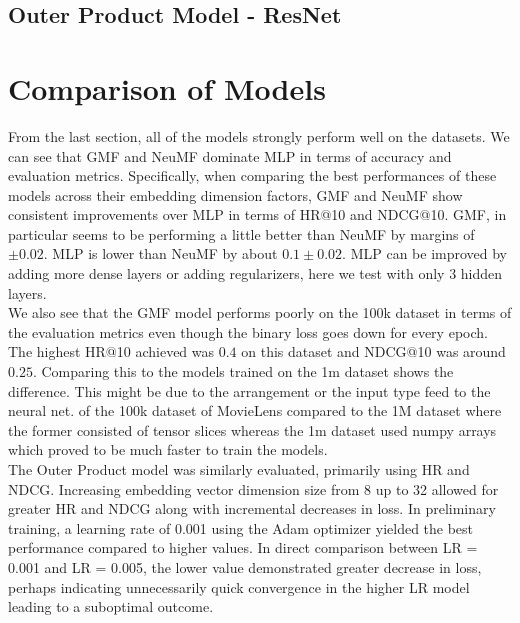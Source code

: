 \documentclass{article}
\begin{document}
\subsection{Outer Product Model - ResNet}


\section{Comparison of Models}
From the last section, all of the models strongly perform well on the datasets. We can see that GMF and NeuMF dominate MLP in terms of accuracy and evaluation metrics. Specifically, when comparing the best performances of these models across their embedding dimension factors, GMF and NeuMF show consistent improvements over MLP in terms of HR@10 and NDCG@10. GMF, in particular seems to be performing a little better than NeuMF by margins of $\pm 0.02$. MLP is lower than NeuMF by about $0.1 \pm 0.02$. MLP can be improved by adding more dense layers or adding regularizers, here we test with only 3 hidden layers.\\

We also see that the GMF model performs poorly on the 100k dataset in terms of the evaluation metrics even though the binary loss goes down for every epoch. The highest HR@10 achieved was $0.4$ on this dataset and NDCG@10 was around $0.25$. Comparing this to the models trained on the 1m dataset shows the difference. This might be due to the arrangement or the input type feed to the neural net. of the 100k dataset of MovieLens compared to the 1M dataset where the former consisted of tensor slices whereas the 1m dataset used numpy arrays which proved to be much faster to train the models.\\

The Outer Product model was similarly evaluated, primarily using HR and NDCG. Increasing embedding vector dimension size from 8 up to 32 allowed for greater HR and NDCG along with incremental decreases in loss. In preliminary training, a learning rate of 0.001 using the Adam optimizer yielded the best performance compared to higher values. In direct comparison between LR = 0.001 and LR = 0.005, the lower value demonstrated greater decrease in loss, perhaps indicating unnecessarily quick convergence in the higher LR model leading to a suboptimal outcome.\\
\end{document}
